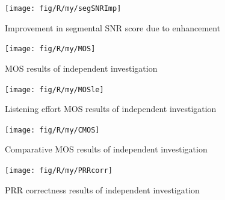 \begin{figure}[h]
\noindent \begin{centering}
\texttt{[image: fig/R/my/segSNRImp]}
\par\end{centering}

\protect\caption{\label{fig:my-segSNR-imp}Improvement in segmental \foreignlanguage{australian}{\acs{SNR}
score due to enhancement}%
}
\end{figure}


\begin{figure}[h]
\noindent \begin{centering}
\texttt{[image: fig/R/my/MOS]}
\par\end{centering}

\protect\caption{\label{fig:my-MOS}\foreignlanguage{australian}{\acs{MOS} results
of independent investigation}%
}
\end{figure}


\begin{figure}[h]
\noindent \begin{centering}
\texttt{[image: fig/R/my/MOSle]}
\par\end{centering}

\protect\caption{\label{fig:my-MOSle}Listening effort \foreignlanguage{australian}{\acs{MOS}
results of independent investigation}%
}
\end{figure}


\begin{figure}[h]
\noindent \begin{centering}
\texttt{[image: fig/R/my/CMOS]}
\par\end{centering}

\protect\caption{\label{fig:my-CMOS}Comparative \foreignlanguage{australian}{\acs{MOS}
results of independent investigation}%
}
\end{figure}


\begin{figure}[h]
\noindent \begin{centering}
\texttt{[image: fig/R/my/PRRcorr]}
\par\end{centering}

\protect\caption{\label{fig:my-PRRcorr}\foreignlanguage{australian}{\acs{PRR} correctness
results of independent investigation}%
}
\end{figure}


